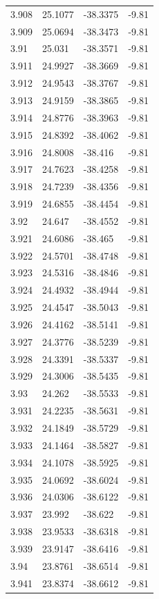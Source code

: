 \begin{tabular}{llll}
3.908 & 25.1077 & -38.3375 & -9.81 \\
3.909 & 25.0694 & -38.3473 & -9.81 \\
3.91 & 25.031 & -38.3571 & -9.81 \\
3.911 & 24.9927 & -38.3669 & -9.81 \\
3.912 & 24.9543 & -38.3767 & -9.81 \\
3.913 & 24.9159 & -38.3865 & -9.81 \\
3.914 & 24.8776 & -38.3963 & -9.81 \\
3.915 & 24.8392 & -38.4062 & -9.81 \\
3.916 & 24.8008 & -38.416 & -9.81 \\
3.917 & 24.7623 & -38.4258 & -9.81 \\
3.918 & 24.7239 & -38.4356 & -9.81 \\
3.919 & 24.6855 & -38.4454 & -9.81 \\
3.92 & 24.647 & -38.4552 & -9.81 \\
3.921 & 24.6086 & -38.465 & -9.81 \\
3.922 & 24.5701 & -38.4748 & -9.81 \\
3.923 & 24.5316 & -38.4846 & -9.81 \\
3.924 & 24.4932 & -38.4944 & -9.81 \\
3.925 & 24.4547 & -38.5043 & -9.81 \\
3.926 & 24.4162 & -38.5141 & -9.81 \\
3.927 & 24.3776 & -38.5239 & -9.81 \\
3.928 & 24.3391 & -38.5337 & -9.81 \\
3.929 & 24.3006 & -38.5435 & -9.81 \\
3.93 & 24.262 & -38.5533 & -9.81 \\
3.931 & 24.2235 & -38.5631 & -9.81 \\
3.932 & 24.1849 & -38.5729 & -9.81 \\
3.933 & 24.1464 & -38.5827 & -9.81 \\
3.934 & 24.1078 & -38.5925 & -9.81 \\
3.935 & 24.0692 & -38.6024 & -9.81 \\
3.936 & 24.0306 & -38.6122 & -9.81 \\
3.937 & 23.992 & -38.622 & -9.81 \\
3.938 & 23.9533 & -38.6318 & -9.81 \\
3.939 & 23.9147 & -38.6416 & -9.81 \\
3.94 & 23.8761 & -38.6514 & -9.81 \\
3.941 & 23.8374 & -38.6612 & -9.81 \\

\end{tabular}

